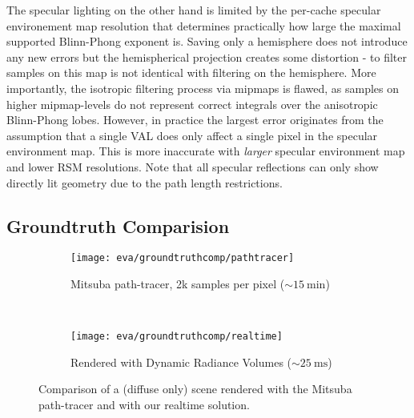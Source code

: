 \documentclass[thesis.tex]{subfiles}
\begin{document}
The specular lighting on the other hand is limited by the per-cache specular environement map resolution that determines practically how large the maximal supported Blinn-Phong exponent is.
Saving only a hemisphere does not introduce any new errors but the hemispherical projection creates some distortion - to filter samples on this map is not identical with filtering on the hemisphere.
More importantly, the isotropic filtering process via mipmaps is flawed, as samples on higher mipmap-levels do not represent correct integrals over the anisotropic Blinn-Phong lobes.
However, in practice the largest error originates from the assumption that a single VAL does only affect a single pixel in the specular environment map.
This is more inaccurate with \emph{larger} specular environment map and lower RSM resolutions.
Note that all specular reflections can only show directly lit geometry due to the path length restrictions.



%

\subsection{Groundtruth Comparision}
\begin{figure}[h]
\centering
\begin{subfigure}[b]{0.7\textwidth}
\texttt{[image: eva/groundtruthcomp/pathtracer]}
\caption{Mitsuba \cite{bib:mitsuba} path-tracer, 2k samples per pixel ($\sim\SI{15}{\minute}$)}
\end{subfigure}
\\
\begin{subfigure}[b]{0.7\textwidth}
\texttt{[image: eva/groundtruthcomp/realtime]}
\caption{Rendered with Dynamic Radiance Volumes ($\sim\SI{25}{\milli\second}$)}
\end{subfigure}
\caption{Comparison of a (diffuse only) scene rendered with the Mitsuba \cite{bib:mitsuba} path-tracer and with our realtime solution.}
\label{fig:groundtruthcomparision}
\end{figure}
\end{document}

